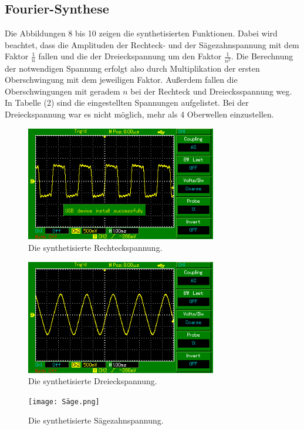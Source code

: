\subsection{Fourier-Synthese}
Die Abbildungen 8 bis 10 zeigen die synthetisierten Funktionen. Dabei wird beachtet,
dass die Amplituden der Rechteck- und der Sägezahnspannung mit dem Faktor $\frac{1}{n}$ fallen
und die der Dreieckspannung um den Faktor $\frac{1}{n^2}$. Die Berechnung der notwendigen Spannung erfolgt also durch
Multiplikation der ersten Oberschwingung mit dem jeweiligen Faktor.
Außerdem fallen die Oberschwingungen mit geradem $n$
bei der Rechteck und Dreiecksspannung weg. In Tabelle (2) sind die eingestellten Spannungen aufgelistet.
Bei der Dreieckspannung war es nicht möglich, mehr als 4 Oberwellen einzustellen.
\begin{figure}[H]
  \centering
  \includegraphics[height=5cm]{rechteck.png}
  \caption{Die synthetisierte Rechteckspannung.}
  \label{fig:rechteck}
\end{figure}
\begin{figure}
  \centering
  \includegraphics[height=5cm]{Dreieck.png}
  \caption{Die synthetisierte Dreieckspannung.}
  \label{fig:rechteck}
\end{figure}
\begin{figure}
  \centering
  \texttt{[image: Säge.png]}
  \caption{Die synthetisierte Sägezahnspannung.}
  \label{fig:rechteck}
\end{figure}



